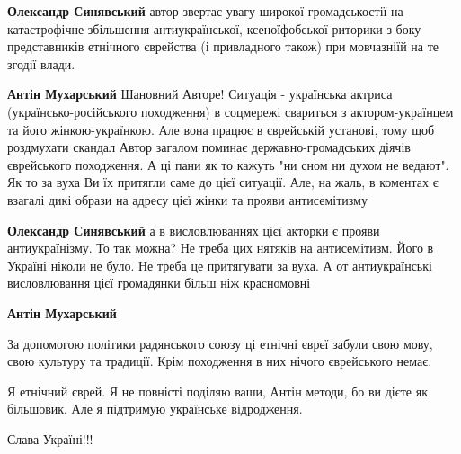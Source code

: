 \begin{itemize}
\begin{itemize}
\textbf{Олександр Синявський} автор звертає увагу широкої громадськостії на
катастрофічне збільшення антиукраїнської, ксеноїфобської риторики з боку
представників етнічного єврейства (і привладного також) при мовчазніїй на те
згодії влади.

\begin{itemize}
 
\textbf{Антін Мухарський} Шановний Авторе! Ситуація - українська актриса (українсько-російського походження) в соцмережі свариться з актором-українцем та його жінкою-українкою. Але вона працює в єврейській установі, тому щоб роздмухати скандал Автор загалом поминає державно-громадських діячів єврейського походження. А ці пани як то кажуть "ни сном ни духом не ведают". Як то за вуха Ви їх притягли саме до цієї ситуації. Але, на жаль, в коментах є взагалі дикі образи на адресу цієї жінки та прояви антисемітизму

 
\textbf{Олександр Синявський} а в висловлюваннях цієї акторки є прояви антиукраїнізму. То так можна? Не треба цих нятяків на антисемітизм. Його в Україні ніколи не було. Не треба це притягувати за вуха. А от антиукраїнські висловлювання цієї громадянки більш ніж красномовні

 
\textbf{Антін Мухарський} 

За допомогою політики радянського союзу ці етнічні євреї забули свою мову, свою
культуру та традиції. Крім походження в них нічого єврейського немає.

Я етнічний єврей. Я не повністі поділяю ваши, Антін методи, бо ви дієте як
більшовик. Але я підтримую українське відродження.

Слава Україні!!!



\end{itemize}
\end{itemize}
\end{itemize}
